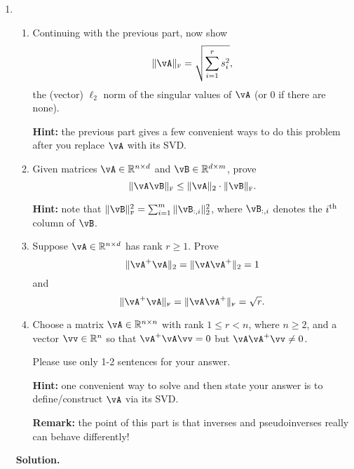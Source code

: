 \documentclass{article}
\def\R{\mathbb{R}}
\def\tF{{\scriptscriptstyle\textup{F}}}
\theoremstyle{definition}
\theoremstyle{remark}
\newenvironment{Q}
        {%
            \clearpage
        \item
            }
        {%
            \phantom{s}
          \bigskip
          \textbf{Solution.}
        }
\begin{document}
\begin{enumerate}
\begin{Q}
\begin{enumerate}
                        \item
                            Continuing with the previous part, now show
                            \[
                                \|\vA\|_\tF = \sqrt{ \sum_{i=1}^r s_i^2 },
                            \]
                        the (vector) $\ell_2$ norm of the singular values of $\vA$ (or 0 if there are none).

                            \textbf{Hint:} the previous part gives a few convenient ways to do this problem
                            after you replace $\vA$ with its SVD.

                        \item
                            Given matrices $\vA\in\R^{n\times d}$ and $\vB\in\R^{d\times m}$, prove
                            \[
                                \|\vA\vB\|_\tF \leq \|\vA\|_2 \cdot \|\vB\|_\tF.
                            \]

                            \textbf{Hint:} note that
                            $\|\vB\|_\tF^2 = \sum_{i=1}^m \|\vB_{:,i}\|_2^2$,
                            where $\vB_{:,i}$ denotes the $i^\textup{th}$ column of $\vB$.
                    \item
                        Suppose $\vA\in\R^{n\times d}$ has rank $r\geq 1$. Prove
                            \[
                                \|\vA^+ \vA\|_2
                            = \|\vA \vA^+\|_2 = 1
                            \]
                        and
                            \[
                                \|\vA^+ \vA\|_\tF
                            = \|\vA \vA^+\|_\tF = \sqrt{r}.
                            \]

                    \item
                        Choose a matrix $\vA\in\R^{n\times n}$ with rank $1 \leq r < n$, where $n\geq 2$,
                            and a vector $\vv\in\R^n$ so that $\vA^+\vA \vv = 0$ but $\vA\vA^+ \vv \neq 0$.

                            Please use only 1-2 sentences for your answer.

                          \textbf{Hint:} one convenient way to solve and then state your answer is to define/construct
                          $\vA$ via its SVD.

                          \textbf{Remark:} the point of this part is that inverses and pseudoinverses really
                          can behave differently!




\end{enumerate}
\end{Q}
\end{enumerate}
\end{document}
